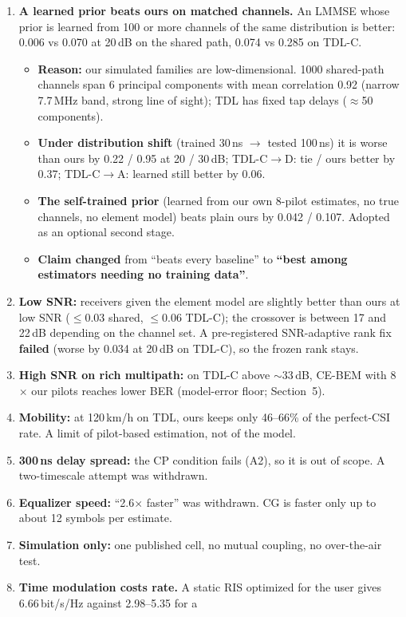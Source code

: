 \documentclass[11pt,a4paper]{article}
\begin{document}
\begin{enumerate}
\item \textbf{A learned prior beats ours on matched channels.} An LMMSE whose prior is learned from 100 or more channels of
the same distribution is better: 0.006 vs 0.070 at 20\,dB on the shared path, 0.074 vs 0.285 on TDL-C.
  \begin{itemize}
  \item \textbf{Reason:} our simulated families are low-dimensional. 1000 shared-path channels span 6 principal components
  with mean correlation 0.92 (narrow 7.7\,MHz band, strong line of sight); TDL has fixed tap delays ($\approx$50 components).
  \item \textbf{Under distribution shift} (trained 30\,ns $\to$ tested 100\,ns) it is worse than ours by 0.22 / 0.95 at 20 /
  30\,dB; TDL-C$\to$D: tie / ours better by 0.37; TDL-C$\to$A: learned still better by 0.06.
  \item \textbf{The self-trained prior} (learned from our own 8-pilot estimates, no true channels, no element model) beats
  plain ours by 0.042 / 0.107. Adopted as an optional second stage.
  \item \textbf{Claim changed} from ``beats every baseline'' to \textbf{``best among estimators needing no training data''}.
  \end{itemize}
\item \textbf{Low SNR:} receivers given the element model are slightly better than ours at low SNR ($\le0.03$ shared,
$\le0.06$ TDL-C); the crossover is between 17 and 22\,dB depending on the channel set. A pre-registered SNR-adaptive rank fix
\textbf{failed} (worse by 0.034 at 20\,dB on TDL-C), so the frozen rank stays.
\item \textbf{High SNR on rich multipath:} on TDL-C above $\sim$33\,dB, CE-BEM with 8$\times$ our pilots reaches lower BER
(model-error floor; Section~5).
\item \textbf{Mobility:} at 120\,km/h on TDL, ours keeps only 46--66\% of the perfect-CSI rate. A limit of pilot-based
estimation, not of the model.
\item \textbf{300\,ns delay spread:} the CP condition fails (A2), so it is out of scope. A two-timescale attempt was withdrawn.
\item \textbf{Equalizer speed:} ``2.6$\times$ faster'' was withdrawn. CG is faster only up to about 12 symbols per estimate.
\item \textbf{Simulation only:} one published cell, no mutual coupling, no over-the-air test.
\item \textbf{Time modulation costs rate.} A static RIS optimized for the user gives 6.66\,bit/s/Hz against 2.98--5.35 for a

\end{enumerate}
\end{document}
